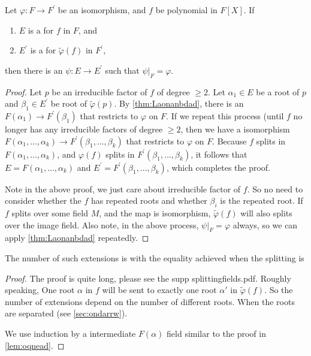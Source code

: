 \documentclass{article}
\begin{document}
\begin{thma}
Let $\varphi: F \rightarrow F^{\prime}$ be an isomorphism, and $f$ be  polynomial in $F[X]$. If 
\begin{enumerate}
    \item $E$ is a  for $f$ in $F$, and
    \item  $E^{\prime}$ is a  for $\tilde{\varphi}(f)$ in $F^{\prime}$,
\end{enumerate} then there is an  $\psi: E \rightarrow E^{\prime}$ such that $\left.\psi\right|_{F}=\varphi$.
\end{thma}
\begin{proof}
Let $p$ be an irreducible factor of $f$ of degree $\geq 2$. Let $\alpha_{1} \in E$ be a root of $p$ and $\beta_{1} \in E^{\prime}$ be root of $\tilde{\varphi}(p)$. By \cref{thm:Laonanbdad}, there is an  $F\left(\alpha_{1}\right) \rightarrow F^{\prime}\left(\beta_{1}\right)$ that restricts to $\varphi$ on $F$. If we repeat this process (until $f$ no longer has any irreducible factors of degree $\geq 2$, then we have a isomorphism $F\left(\alpha_{1}, \ldots, \alpha_{k}\right) \rightarrow F^{\prime}\left(\beta_{1}, \ldots, \beta_{k}\right)$ that restricts to $\varphi$ on $F$. Because $f$ splits in $F\left(\alpha_{1}, \ldots, \alpha_{k}\right)$, and $\varphi(f)$ splits in $F^{\prime}\left(\beta_{1}, \ldots, \beta_{k}\right)$, it follows that $E=F\left(\alpha_{1}, \ldots, \alpha_{k}\right)$ and $E^{\prime}=F^{\prime}\left(\beta_{1}, \ldots, \beta_{k}\right)$, which completes the proof.

Note in the above proof, we just care about irreducible factor of $f$. So no need to consider whether the $f$ has repeated roots and whether $\beta_{i}$ is the repeated root. If $f$ splits over some field $M$, and the map is isomorphism, $\tilde{\varphi}(f)$ will also splits over the image field. Also note, in the above process, $\left.\psi\right|_{F}=\varphi$ always, so we can apply \cref{thm:Laonanbdad} repeatedly.
\end{proof} 
\begin{cora}
   The number of such extensions is  with the equality achieved when the splitting is 
\end{cora}
\begin{proof}
The proof is quite long, please see the supp splittingfields.pdf. Roughly speaking, One root $\alpha$ in $f$ will be sent to exactly one root $\alpha'$ in $\tilde{\varphi}(f)$. So the number of extensions depend on the number of different roots. When the roots are separated (see \cref{sec:ondarrw}).

We use induction by a intermediate $F(\alpha)$ field similar to the proof in \cref{lem:oqnead}. 
\end{proof}
\end{document}
